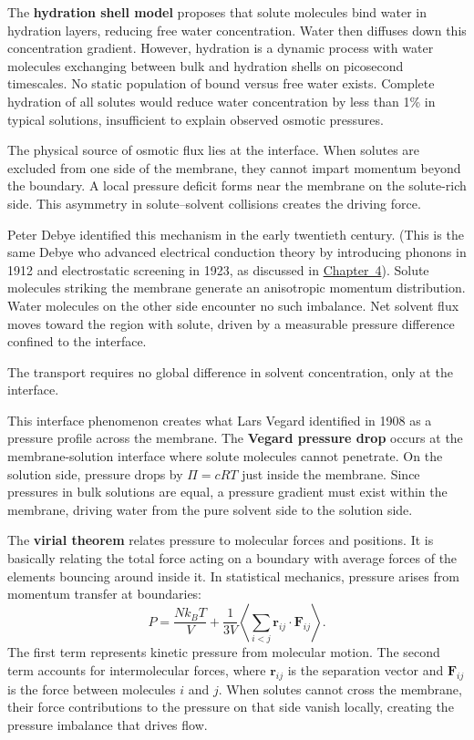 The \textbf{hydration shell model} proposes that solute molecules bind water in hydration layers, reducing \QSOpen{}free\QSClose{} water concentration. Water then diffuses down this concentration gradient. However, hydration is a dynamic process with water molecules exchanging between bulk and hydration shells on picosecond timescales. No static population of \QSOpen{}bound\QSClose{} versus \QSOpen{}free\QSClose{} water exists. Complete hydration of all solutes would reduce water concentration by less than 1\% in typical solutions, insufficient to explain observed osmotic pressures.

The physical source of osmotic flux lies at the interface. When solutes are excluded from one side of the membrane, they cannot impart momentum beyond the boundary. A local pressure deficit forms near the membrane on the solute-rich side. This asymmetry in solute–solvent collisions creates the driving force.

Peter Debye identified this mechanism in the early twentieth century. (This is the same Debye who advanced electrical conduction theory by introducing phonons in 1912 and electrostatic screening in 1923, as discussed in \hyperref[ch:energytransmission]{Chapter~4}). Solute molecules striking the membrane generate an anisotropic momentum distribution. Water molecules on the other side encounter no such imbalance. Net solvent flux moves toward the region with solute, driven by a measurable pressure difference confined to the interface.

The transport requires no global difference in solvent concentration, only at the interface.

This interface phenomenon creates what Lars Vegard identified in 1908 as a pressure profile across the membrane. The \textbf{Vegard pressure drop} occurs at the membrane-solution interface where solute molecules cannot penetrate. On the solution side, pressure drops by $\Pi = cRT$ just inside the membrane. Since pressures in bulk solutions are equal, a pressure gradient must exist within the membrane, driving water from the pure solvent side to the solution side.

The \textbf{virial theorem} relates pressure to molecular forces and positions. It is basically relating the total force acting on a boundary with average forces of the elements bouncing around inside it. In statistical mechanics, pressure arises from momentum transfer at boundaries:
\[
P = \frac{N k_B T}{V} + \frac{1}{3V}\left\langle \sum_{i<j} \mathbf{r}_{ij} \cdot \mathbf{F}_{ij} \right\rangle.
\]
The first term represents kinetic pressure from molecular motion. The second term accounts for intermolecular forces, where $\mathbf{r}_{ij}$ is the separation vector and $\mathbf{F}_{ij}$ is the force between molecules $i$ and $j$. When solutes cannot cross the membrane, their force contributions to the pressure on that side vanish locally, creating the pressure imbalance that drives flow.

